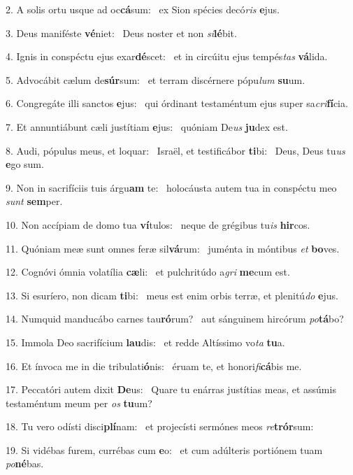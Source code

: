2. A solis ortu usque ad oc\textbf{cá}sum: \ast\  ex Sion spécies decó\textit{ris} \textbf{e}jus.\

3. Deus maniféste \textbf{vé}niet: \ast\  Deus noster et non \textit{si}\textbf{lé}bit.\

4. Ignis in conspéctu ejus exar\textbf{dé}scet: \ast\  et in circúitu ejus tempés\textit{tas} \textbf{vá}lida.\

5. Advocábit cælum de\textbf{súr}sum: \ast\  et terram discérnere pópu\textit{lum} \textbf{su}um.\

6. Congregáte illi sanctos \textbf{e}jus: \ast\  qui órdinant testaméntum ejus super sa\textit{cri}\textbf{fí}cia.\

7. Et annuntiábunt cæli justítiam \textbf{e}jus: \ast\  quóniam De\textit{us} \textbf{ju}dex est.\

8. Audi, pópulus meus, et loquar: \dag\  Israël, et testificábor \textbf{ti}bi: \ast\  Deus, Deus tu\textit{us} \textbf{e}go sum.\

9. Non in sacrifíciis tuis árgu\textbf{am} te: \ast\  holocáusta autem tua in conspéctu meo \textit{sunt} \textbf{sem}per.\

10. Non accípiam de domo tua \textbf{ví}tulos: \ast\  neque de grégibus tu\textit{is} \textbf{hir}cos.\

11. Quóniam meæ sunt omnes feræ sil\textbf{vá}rum: \ast\  juménta in móntibus \textit{et} \textbf{bo}ves.\

12. Cognóvi ómnia volatília \textbf{cæ}li: \ast\  et pulchritúdo a\textit{gri} \textbf{me}cum est.\

13. Si esuríero, non dicam \textbf{ti}bi: \ast\  meus est enim orbis terræ, et plenitú\textit{do} \textbf{e}jus.\

14. Numquid manducábo carnes tau\textbf{ró}rum? \ast\  aut sánguinem hircórum \textit{po}\textbf{tá}bo?\

15. Immola Deo sacrifícium \textbf{lau}dis: \ast\  et redde Altíssimo vo\textit{ta} \textbf{tu}a.\

16. Et ínvoca me in die tribulati\textbf{ó}nis: \ast\  éruam te, et honori\textit{fi}\textbf{cá}bis me.\

17. Peccatóri autem dixit \textbf{De}us: \ast\  Quare tu enárras justítias meas, et assúmis testaméntum meum per \textit{os} \textbf{tu}um?\

18. Tu vero odísti disci\textbf{plí}nam: \ast\  et projecísti sermónes meos \textit{re}\textbf{trór}sum:\

19. Si vidébas furem, currébas cum \textbf{e}o: \ast\  et cum adúlteris portiónem tuam \textit{po}\textbf{né}bas.\

